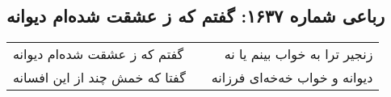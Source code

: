 \begin{center}
\section*{رباعی شماره ۱۶۳۷: گفتم که ز عشقت شده‌ام دیوانه}
\label{sec:1637}
\begin{longtable}{l p{0.5cm} r}
گفتم که ز عشقت شده‌ام دیوانه
&&
زنجیر ترا به خواب بینم یا نه
\\
گفتا که خمش چند از این افسانه
&&
دیوانه و خواب خه‌خه‌ای فرزانه
\\
\end{longtable}
\end{center}
